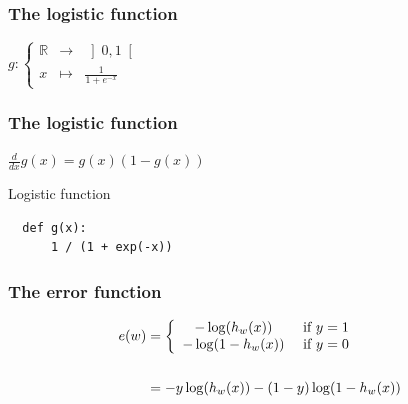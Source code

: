 \begin{frame}
  \frametitle{The logistic function}
  $g:
  \left \{
    \begin{array}{ccc}
      \mathbb{R} & \to & \left]0, 1\right[ \\
      x & \mapsto & \frac{1}{1 + e^{-x}}
    \end{array}
  \right.$
\end{frame}

\begin{frame}
  \frametitle{The logistic function}
  $\frac{d}{dx}g(x) = g(x)(1 - g(x))$
\end{frame}

\begin{frame}[fragile]
  \begin{block}{Logistic function}
    \begin{lstlisting}
  def g(x):
      1 / (1 + exp(-x))
    \end{lstlisting}
  \end{block}
\end{frame}

\begin{frame}
\end{frame}

  \begin{frame}
    \frametitle{The error function}
    \begin{center}
      \begin{equation*}
        \begin{split}
          e(w) & =
          \left \{
            \begin{array}{cl}
              -\log(h_w(x)) & $ if $ y = 1\\
              -\log(1 - h_w(x)) & $ if $ y = 0
            \end{array}
            \right.\\~\\
            & = -y \log(h_w(x)) - (1 - y) \log(1 - h_w(x))\\~\\
          \end{split}
        \end{equation*}
      \end{center}
    \end{frame}

